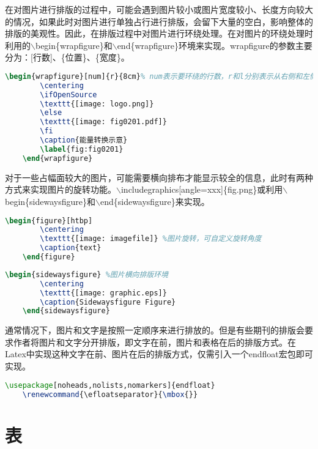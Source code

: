 \documentclass[cn,10pt,math=newtx,citestyle=gb7714-2015,bibstyle=gb7714-2015]{elegantbook}
\begin{document}
在对图片进行排版的过程中，可能会遇到图片较小或图片宽度较小、长度方向较大的情况，如果此时对图片进行单独占行进行排版，会留下大量的空白，影响整体的排版的美观性。因此，在排版过程中对图片进行环绕处理。在对图片的环绕处理时利用的$\backslash$begin\{wrapfigure\}和$\backslash$end\{wrapfigure\}环境来实现。wrapfigure的参数主要分为：[行数]、\{位置\}、\{宽度\}。

\begin{lstlisting}[language=tex]
	\begin{wrapfigure}[num]{r}{8cm}% num表示要环绕的行数，r和l分别表示从右侧和左侧环绕；8cm为环绕留给图形的宽度
		\centering
		\ifOpenSource
		\texttt{[image: logo.png]}
		\else
		\texttt{[image: fig0201.pdf]}
		\fi
		\caption{能量转换示意}
		\label{fig:fig0201}
	\end{wrapfigure}
\end{lstlisting}


对于一些占幅面较大的图片，可能需要横向排布才能显示较全的信息，此时有两种方式来实现图片的旋转功能。$\backslash$includegraphics[angle=xxx]\{fig.png\}或利用$\backslash$begin\{sidewaysfigure\}和$\backslash$end\{sidewaysfigure\}来实现。
\begin{lstlisting}[language=tex]
	\begin{figure}[htbp]
		\centering
		\texttt{[image: imagefile]} %图片旋转，可自定义旋转角度
		\caption{text}
	\end{figure}
\end{lstlisting}

\begin{lstlisting}[language=tex]
	\begin{sidewaysfigure} %图片横向排版环境
		\centering 
		\texttt{[image: graphic.eps]} 
		\caption{Sidewaysfigure Figure} 
	\end{sidewaysfigure}
\end{lstlisting}

通常情况下，图片和文字是按照一定顺序来进行排放的。但是有些期刊的排版会要求作者将图片和文字分开排版，即文字在前，图片和表格在后的排版方式。在Latex中实现这种文字在前、图片在后的排版方式，仅需引入一个endfloat宏包即可实现。

\begin{lstlisting}[language=tex]
	\usepackage[noheads,nolists,nomarkers]{endfloat}
	\renewcommand{\efloatseparator}{\mbox{}}
\end{lstlisting}

\section{表}
\end{document}
